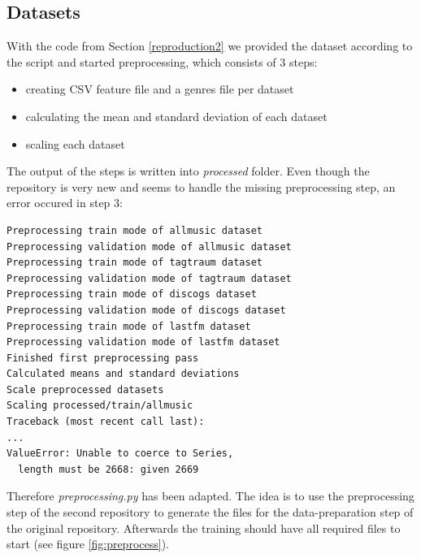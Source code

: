 \documentclass[sigconf,nonacm]{acmart}
\begin{document}
\subsection{Datasets}

With the code from Section \ref{reproduction2} we provided the dataset according to the script and started preprocessing, which consists of 3 steps:
\begin{itemize}
  \item creating CSV feature file and a genres file per dataset
  \item calculating the mean and standard deviation of each dataset
  \item scaling each dataset
\end{itemize}
The output of the steps is written into \textit{processed} folder.
Even though the repository is very new and seems to handle the missing preprocessing step, an error occured in step 3:

\begin{lstlisting}
Preprocessing train mode of allmusic dataset
Preprocessing validation mode of allmusic dataset
Preprocessing train mode of tagtraum dataset
Preprocessing validation mode of tagtraum dataset
Preprocessing train mode of discogs dataset
Preprocessing validation mode of discogs dataset
Preprocessing train mode of lastfm dataset
Preprocessing validation mode of lastfm dataset
Finished first preprocessing pass
Calculated means and standard deviations
Scale preprocessed datasets
Scaling processed/train/allmusic
Traceback (most recent call last):
...
ValueError: Unable to coerce to Series, 
  length must be 2668: given 2669
\end{lstlisting}

Therefore \textit{preprocessing.py} has been adapted. The idea is to use the preprocessing step of the second repository to generate the files for the data-preparation step of the original repository. Afterwards the training should have all required files to start (see figure \ref{fig:preprocess}).
\end{document}
